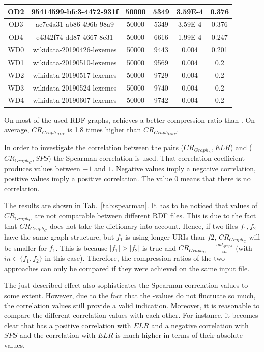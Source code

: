 \begin{center}
\begin{tabular}{|c|c|c|c|c|c|}
		\hline
		OD2 & 95414599-bfc3-4472-931f & 50000 & 5349 & 3.59E-4 & 0.376 \\
		\hline
		OD3 & ac7e4a31-ab86-496b-98a9 & 50000 & 5349 & 3.59E-4 & 0.376 \\
		\hline
		OD4 & e4342f74-dd87-4667-8c31 & 50000 & 6616 & 1.99E-4 & 0.247 \\
		\hline
		\hline
		WD0 & wikidata-20190426-lexemes & 50000 & 9443 & 0.004 & 0.201 \\
		\hline
		WD1 & wikidata-20190510-lexemes & 50000 & 9569 & 0.004 & 0.2 \\
		\hline
		WD2 & wikidata-20190517-lexemes & 50000 & 9729 & 0.004 & 0.2 \\
		\hline
		WD3 & wikidata-20190524-lexemes & 50000 & 9740 & 0.004 & 0.2 \\
		\hline
		WD4 & wikidata-20190607-lexemes & 50000 & 9742 & 0.004 & 0.2 \\
		\hline
	\end{tabular} 
	\label{tab:comparisonDatasets}
\end{center}

\FloatBarrier

On most of the used RDF graphs, \GGRP{} achieves a better compression ratio than \GHDT{}. On average, $CR_{Graph_{HDT}}$ is 1.8 times higher than $CR_{Graph_{GRP}}$.

In order to investigate the correlation between the pairs ($CR_{Graph_C},ELR$) and ($CR_{Graph_C},SPS$) the Spearman correlation is used. That correlation coefficient produces values between $ -1 $ and $ 1 $. Negative values imply a negative correlation, positive values imply a positive correlation. The value 0 means that there is no correlation.~\cite{spearman} 

The results are shown in Tab.~\ref{tab:spearman}.  It has to be noticed that values of $CR_{Graph_C}$ are not comparable between different RDF files. This is due to the fact that $CR_{Graph_C}$ does not take the dictionary into account. Hence, if two files $f_1,f_2$ have the same graph structure, but $f_1$  is using longer URIs than $f2$, $CR_{Graph_C}$ will be smaller for $f_1$. This is because $|f_1|>|f_2|$ is true and $CR_{Graph_C}=\frac{out_{graph}}{in}$ (with $in\in \{f_1,f_2\}$ in this case). Therefore, the compression ratios of the two approaches can only be compared if they were achieved on the same input file.

The just described effect also sophisticates the Spearman correlation values to some extent. However, due to the fact that the -values do not fluctuate so much, the correlation values still provide a valid indication. Moreover, it is reasonable to compare the different correlation values with each other. For instance, it becomes clear that \GGRP{} has a positive correlation with $ELR$ and a negative correlation with $SPS$ and the correlation with $ELR$ is much higher in terms of their absolute values. 

